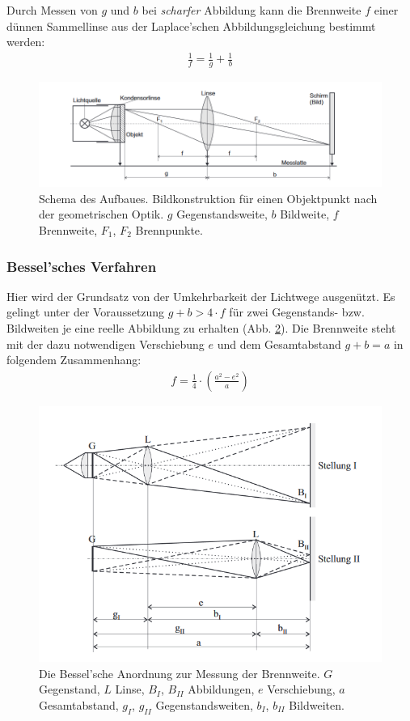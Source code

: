 \documentclass{article}
\begin{document}
Durch Messen von $g$ und $b$ bei \textit{scharfer} Abbildung kann die Brennweite $f$ einer dünnen Sammellinse aus der Laplace'schen Abbildungsgleichung bestimmt werden:
\begin{align}\label{eq:laplace}
\frac1f = \frac1g + \frac1b
\end{align}

\begin{figure}[H]
\centering
\includegraphics[scale=0.5]{laplace.png}
\caption{Schema des Aufbaues. Bildkonstruktion für einen Objektpunkt nach der geometrischen Optik. $g$ Gegenstandsweite, $b$ Bildweite, $f$ Brennweite, $F_1$, $F_2$ Brennpunkte.}
\label{fig:laplace}
\end{figure}


\subsubsection{Bessel'sches Verfahren}
\label{sec:bessel}

Hier wird der Grundsatz von der Umkehrbarkeit der Lichtwege ausgenützt. Es gelingt unter der Voraussetzung $g+b >4\cdot f$ für zwei Gegenstands- bzw. Bildweiten je eine reelle Abbildung zu erhalten (Abb. \ref{fig:bessel}). Die Brennweite steht mit der dazu notwendigen Verschiebung $e$ und dem Gesamtabstand $g+b=a$ in folgendem Zusammenhang:
\begin{align}
\label{eq:bessel}
f = \frac14 \cdot \left( \frac{a^2-e^2}{a}\right)
\end{align}
\begin{figure}[H]
\centering
\includegraphics[scale=0.5]{bessel.png}
\caption{Die Bessel'sche Anordnung zur Messung der Brennweite. $G$ Gegenstand, $L$ Linse, $B_I$, $B_{II}$ Abbildungen, $e$ Verschiebung, $a$ Gesamtabstand, $g_I$, $g_{II}$ Gegenstandsweiten, $b_I$, $b_{II}$ Bildweiten.}
\label{fig:bessel}
\end{figure}
\end{document}
